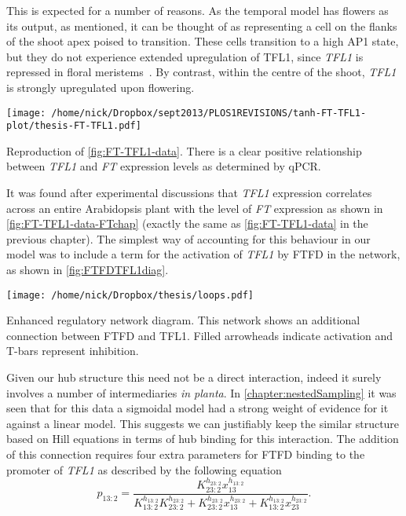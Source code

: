 This is expected for a number of reasons.
As the temporal model has flowers as its output, as mentioned, it can be thought of as representing a cell on the flanks of the shoot apex poised to transition.
These cells transition to a high AP1 state, but they do not experience extended upregulation of TFL1, since \emph{TFL1} is repressed in floral meristems~\cite{ratcliffe1999}.
By contrast, within the centre of the shoot, \emph{TFL1} is strongly upregulated upon flowering.
\begin{marginfigure}
    \texttt{[image: /home/nick/Dropbox/sept2013/PLOS1REVISIONS/tanh-FT-TFL1-plot/thesis-FT-TFL1.pdf]}
    \caption{Reproduction of \autoref{fig:FT-TFL1-data}.
      There is a clear positive relationship between \emph{TFL1} and \emph{FT} expression levels as determined by qPCR.
  }
  \label{fig:FT-TFL1-data-FTchap}
\end{marginfigure}
It was found after experimental discussions that \emph{TFL1} expression correlates across an entire Arabidopsis plant with the level of \emph{FT} expression as shown in \autoref{fig:FT-TFL1-data-FTchap} (exactly the same as \autoref{fig:FT-TFL1-data} in the previous chapter).
The simplest way of accounting for this behaviour in our model was to include a term for the activation of \emph{TFL1} by FTFD in the network, as shown in \autoref{fig:FTFDTFL1diag}.
\begin{marginfigure}%
\texttt{[image: /home/nick/Dropbox/thesis/loops.pdf]}
\caption{Enhanced regulatory network diagram.  
  This network shows an additional connection between FTFD and TFL1.
  Filled arrowheads indicate activation and T-bars represent inhibition.
\label{fig:FTFDTFL1diag}}
\end{marginfigure}
Given our hub structure this need not be a direct interaction, indeed it surely involves a number of intermediaries \emph{in planta}.
In \autoref{chapter:nestedSampling} it was seen that for this data a sigmoidal model had a strong weight of evidence for it against a linear model.
This suggests we can justifiably keep the similar structure based on Hill equations in terms of hub binding for this interaction.
The addition of this connection requires four extra parameters for FTFD binding to the promoter of \emph{TFL1} as described by the following equation
\begin{equation*}
p_{13:2} = \frac{K_{23:2}^{h_{23:2}}x_{13}^{h_{13:2}}}{K_{13:2}^{h_{13:2}}K_{23:2}^{h_{23:2}}
+ K_{23:2}^{h_{23:2}}x_{13}^{h_{23:2}} + K_{13:2}^{h_{13:2}}x_{23}^{h_{23:2}}}.
\end{equation*}

